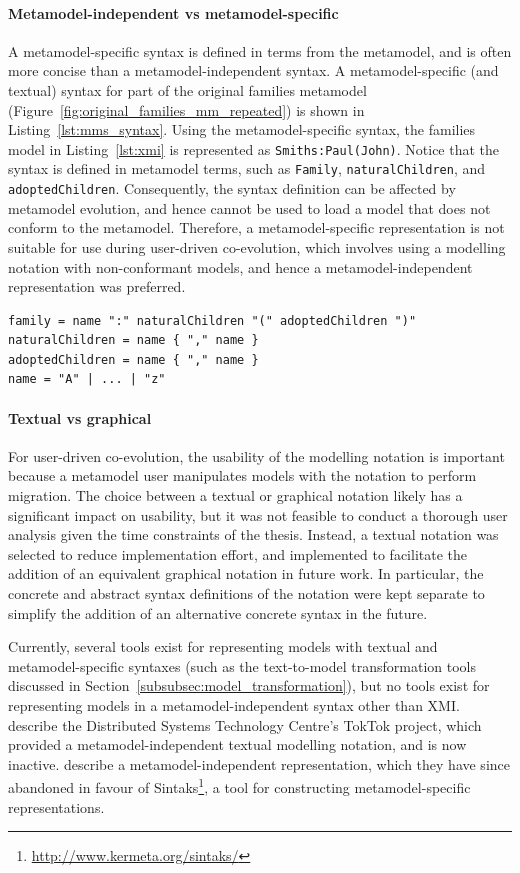 \paragraph{Metamodel-independent vs metamodel-specific} A metamodel-specific syntax is defined in terms from the metamodel, and is often more concise than a metamodel-independent syntax. A metamodel-specific (and textual) syntax for part of the original families metamodel (Figure~\ref{fig:original_families_mm_repeated}) is shown in Listing~\ref{lst:mms_syntax}. Using the metamodel-specific syntax, the families model in Listing~\ref{lst:xmi} is represented as \texttt{Smiths:Paul(John)}. Notice that the syntax is defined in metamodel terms, such as \texttt{Fa\-mi\-ly}, \texttt{na\-tu\-ralCh\-il\-dr\-en}, and \texttt{ad\-op\-tedCh\-il\-dr\-en}. Consequently, the syntax definition can be affected by metamodel evolution, and hence cannot be used to load a model that does not conform to the metamodel. Therefore, a metamodel-specific representation is not suitable for use during user-driven co-evolution, which involves using a modelling notation with non-conformant models, and hence a metamodel-independent representation was preferred.

\begin{lstlisting}[caption=A metamodel-specific syntax for families in EBNF, label=lst:mms_syntax, language=EBNF]
family = name ":" naturalChildren "(" adoptedChildren ")"
naturalChildren = name { "," name }
adoptedChildren = name { "," name }
name = "A" | ... | "z"
\end{lstlisting}

\paragraph{Textual vs graphical} For user-driven co-evolution, the usability of the modelling notation is important because a metamodel user manipulates models with the notation to perform migration. The choice between a textual or graphical notation likely has a significant impact on usability, but it was not feasible to conduct a thorough user analysis given the time constraints of the thesis. Instead, a textual notation was selected to reduce implementation effort, and implemented to facilitate the addition of an equivalent graphical notation in future work. In particular, the concrete and abstract syntax definitions of the notation were kept separate to simplify the addition of an alternative concrete syntax in the future.

Currently, several tools exist for representing models with textual and metamodel-specific syntaxes (such as the text-to-model transformation tools discussed in Section~\ref{subsubsec:model_transformation}), but no tools exist for representing models in a metamodel-independent syntax other than XMI. \cite{steel01hutn} describe the Distributed Systems Technology Centre's TokTok project, which provided a metamodel-independent textual modelling notation, and is now inactive. \cite{muller05hutn} describe a me\-ta\-mo\-del-inde\-pe\-nd\-ent representation, which they have since abandoned in favour of Sintaks\footnote{\url{http://www.kermeta.org/sintaks/}}, a tool for constructing metamodel-specific representations.

